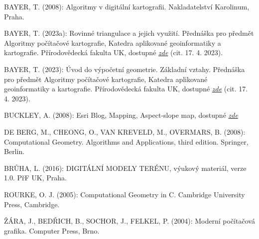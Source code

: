 \begin{thebibliography}{9}

BAYER, T. (2008): Algoritmy v digitální kartografii. Nakladatelství Karolinum, Praha.

BAYER, T. (2023a): Rovinné triangulace a jejich využití. Přednáška pro předmět Algoritmy počítačové kartografie, Katedra aplikované geoinformatiky a kartografie. Přírodovědecká fakulta UK, dostupné \href{http://web.natur.cuni.cz/~bayertom/images/courses/Adk/adk5_new.pdf}{\emph{zde}} (cit. 17. 4. 2023).

BAYER, T. (2023): Úvod do výpočetní geometrie. Základní vztahy. Přednáška pro předmět Algoritmy počítačové kartografie, Katedra aplikované geoinformatiky a kartografie. Přírodovědecká fakulta UK, dostupné \href{http://web.natur.cuni.cz/~bayertom/images/courses/Adk/adk2.pdf}{\emph{zde}} (cit. 17. 4. 2023).

BUCKLEY, A. (2008): Esri Blog, Mapping, Aspect-slope map, dostupné 
\href{https://www.esri.com/arcgis-blog/products/product/mapping/aspect-slope-map/}{\emph{zde}}

DE BERG, M., CHEONG, O., VAN KREVELD, M., OVERMARS, B. (2008): Computational Geometry. Algorithms and Applications, third edition. Springer, Berlin.

BRŮHA, L. (2016): DIGITÁLNÍ	MODELY	TERÉNU, výukový materiál, verze 1.0. PřF UK, Praha.

ROURKE, O. J. (2005): Computational Geometry in C. Cambridge University Press, Cambridge.

ŽÁRA, J., BEDŘICH, B., SOCHOR, J., FELKEL, P. (2004): Moderní počítačová grafika. Computer Press, Brno.
\end{thebibliography}